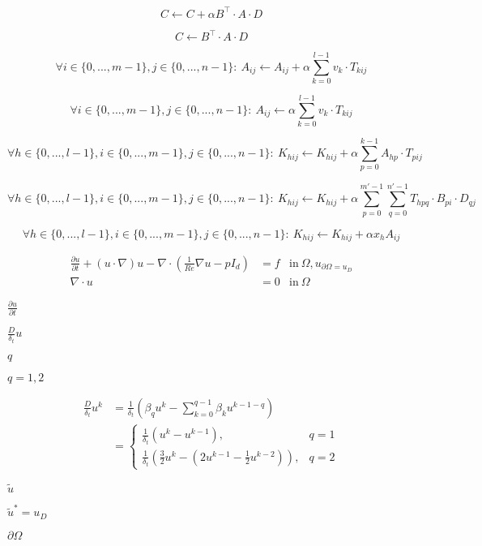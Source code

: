 \documentclass{article}
\begin{document}
\[ C \leftarrow C + \alpha B^\top\cdot A\cdot D\]
\pagebreak

\[ C \leftarrow B^\top\cdot A\cdot D\]
\pagebreak

\[ \forall i\in\{0,...,m-1\},j\in\{0,...,n-1\}:~ A_{ij} \leftarrow A_{ij} + \alpha \sum_{k=0}^{l-1} v_k\cdot T_{kij}\]
\pagebreak

\[ \forall i\in\{0,...,m-1\},j\in\{0,...,n-1\}:~ A_{ij} \leftarrow \alpha \sum_{k=0}^{l-1} v_k\cdot T_{kij}\]
\pagebreak

\[ \forall h\in\{0,...,l-1\}, i\in\{0,...,m-1\},j\in\{0,...,n-1\}:~ K_{hij} \leftarrow K_{hij} +
    \alpha \sum_{p=0}^{k-1} A_{hp}\cdot T_{pij}\]
\pagebreak

\[ \forall h\in\{0,...,l-1\}, i\in\{0,...,m-1\}, j\in\{0,...,n-1\}:~ K_{hij} \leftarrow K_{hij} +
    \alpha \sum_{p=0}^{m'-1}\sum_{q=0}^{n'-1} T_{hpq}\cdot B_{pi}\cdot D_{qj} \]
\pagebreak

\[ \forall h\in\{0,...,l-1\}, i\in\{0,...,m-1\},j\in\{0,...,n-1\}:~ K_{hij} \leftarrow K_{hij} +
    \alpha x_h A_{ij}\]
\pagebreak

\begin{align*}
  \frac{\partial u}{\partial t} + (u \cdot \nabla ) u
  - \nabla \cdot \left(\frac{1}{Re} \nabla u - p I_d \right) & = f & \mathrm{in~} \Omega,
  u_{\partial \Omega = u_D} \\
  \nabla \cdot u & = 0 & \mathrm{in~} \Omega
\end{align*}
\pagebreak

$\frac{\partial u}{\partial t}$
\pagebreak

$ \frac{D }{\delta_t}u $
\pagebreak

$ q $
\pagebreak

$ q=1,2$
\pagebreak

\begin{align*}
  \frac{D }{\delta_t} u^k & = \frac{1}{\delta_t} (\beta_q u^{k} - \sum_{k=0}^{q-1} \beta_k u^{k-1-q} ) \\
  & =
  \begin{cases}
    \frac{1}{\delta_t} (u^k - u^{k-1}), & q = 1 \\
    \frac{1}{\delta_t} \left(\frac{3}{2} u^k - (2 u^{k-1} - \frac{1}{2}u^{k-2}) \right), & q = 2
  \end{cases}
\end{align*}
\pagebreak

$ \tilde{u} $
\pagebreak

$ \tilde{u}^* = u_D $
\pagebreak

$ \partial \Omega$
\pagebreak
\end{document}
